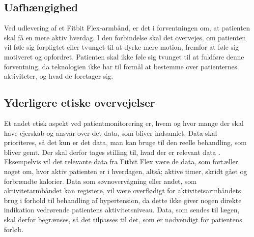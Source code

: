 \subsection{Uafhængighed}

Ved udlevering af et Fitbit Flex-armbånd, er det i forventningen om, at patienten skal få en mere aktiv hverdag. I den forbindelse skal det overvejes, om patienten vil føle sig forpligtet eller tvunget til at dyrke mere motion, fremfor at føle sig motiveret og opfordret. Patienten skal ikke føle sig tvunget til at fuldføre denne forventning, da teknologien ikke har til formål at bestemme over patienternes aktiviteter, og hvad de foretager sig. \citep{Nordgren2013}

\subsection{Yderligere etiske overvejelser}
Et andet etisk aspekt ved patientmonitorering er, hvem og hvor mange der skal have ejerskab og ansvar over det data, som bliver indsamlet. Data skal prioriteres, så det kun er det data, man kan bruge til den reelle behandling, som bliver gemt. Der skal derfor tages stilling til, hvad der er relevant data \citep{patienthome2015}. Eksempelvis vil det relevante data fra Fitbit Flex være de data, som fortæller noget om, hvor aktiv patienten er i hverdagen, altså; aktive timer, skridt gået og forbrændte kalorier. Data som søvnovervågning eller andet, som aktivitetarmbåndet kan registere, vil være overflødigt for aktivitetsarmbåndets brug i forhold til behandling af hypertension, da dette ikke giver nogen direkte indikation vedrørende patientens aktivitetsniveau. Data, som sendes til lægen, skal derfor begrænses, så det tilpasses til det, som er nødvendigt for patientens forløb. 














